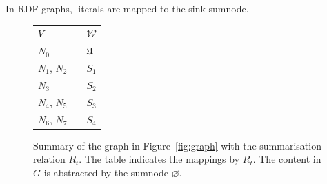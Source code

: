 \begin{remark}
In RDF graphs, literals are mapped to the sink sumnode.
\end{remark}


\begin{figure}
	\centering
	\begin{minipage}{.7\textwidth}
		\resizebox{\textwidth}{!}{
			
		}
	\end{minipage}
	\quad
	\begin{minipage}[h]{.25\textwidth}
		\centering
		\caption*{$R_t\left(V, \mathcal{W}\right)$}
		\begin{tabular}{lc@{\hs}l}
			\toprule
			$V$ & \phantom{a} & $\mathcal{W}$ \\
			\cmidrule{1-1} \cmidrule{3-3}
			$N_0$ & \phantom{a} & $\mathfrak{U}$ \\
			$N_1$, $N_2$ & \phantom{a} & $S_1$ \\
			$N_3$ & \phantom{a} & $S_2$ \\
			$N_4$, $N_5$ & \phantom{a} & $S_3$ \\
			$N_6$, $N_7$ & \phantom{a} & $S_4$ \\
			\bottomrule
		\end{tabular}
	\end{minipage}
	\caption{Summary of the graph in Figure~\ref{fig:graph} with the summarisation relation $R_t$. The table indicates the mappings by $R_t$. The content in $G$ is abstracted by the sumnode $\varnothing$.}
	\label{fig:classes-summary}
\end{figure}

%


